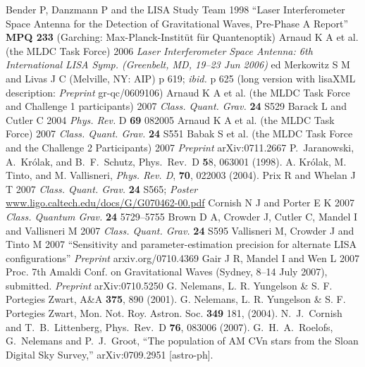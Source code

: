 \documentclass{iopart}
\begin{document}
\begin{thebibliography}{99}
%
 Bender P, Danzmann P and the LISA Study Team 1998 ``Laser Interferometer Space Antenna for the Detection of Gravitational Waves, Pre-Phase A Report'' \textbf{MPQ 233} (Garching: Max-Planck-Instit\"ut f\"ur Quantenoptik) 
%
 Arnaud K A et al. (the MLDC Task Force) 2006 \textit{Laser Interferometer Space Antenna: 6th International LISA Symp. (Greenbelt, MD, 19--23 Jun 2006)} ed Merkowitz S M and Livas J C (Melville, NY: AIP) p 619; \textit{ibid.} p 625 (long version with lisaXML description: \textit{Preprint} gr-qc/0609106)
%
 Arnaud K A et al. (the MLDC Task Force and Challenge 1 participants) 2007 \textit{Class. Quant. Grav.} \textbf{24} S529
%
 Barack L and Cutler C 2004 \textit{Phys. Rev.} D \textbf{69} 082005
%
 Arnaud K A et al. (the MLDC Task Force) 2007 \textit{Class. Quant. Grav.} \textbf{24} S551
%
 Babak S  et al. (the MLDC Task Force and the Challenge 2 Participants) 2007 \textit{Preprint}  arXiv:0711.2667
%
P.\ Jaranowski, A.\ Kr\'olak, and B.\ F.\ Schutz, Phys.\ Rev.\ D
{\textbf 58}, 063001 (1998).
%
 A. Kr\'olak, M. Tinto, and M. Vallisneri, {\it Phys. Rev. D}, {\bf 70},
022003 (2004).
%
 Prix R and Whelan J T 2007 \textit{Class. Quant. Grav.} \textbf{24} S565; \textit{Poster} \url{www.ligo.caltech.edu/docs/G/G070462-00.pdf}
%
 Cornish N J and Porter E K 2007 \textit{Class. Quantum Grav.} \textbf{24} 5729--5755
%
 Brown D A, Crowder J, Cutler C, Mandel I and Vallisneri M 2007 \textit{Class. Quant. Grav.} \textbf{24} S595
%
 Vallisneri M, Crowder J and Tinto M 2007 ``Sensitivity and parameter-estimation precision for alternate LISA configurations'' \textit{Preprint} arxiv.org/0710.4369 
%
 Gair J R, Mandel I and Wen L 2007 Proc. 7th Amaldi Conf. on Gravitational Waves (Sydney, 8--14 July 2007), submitted. \textit{Preprint} arXiv:0710.5250
%
 G. Nelemans, L. R. Yungelson \& S. F. Portegies Zwart, A\&A {\bf 375}, 890 (2001).
%
 G. Nelemans, L. R. Yungelson \& S. F. Portegies Zwart, Mon. Not. Roy. Astron. Soc.
{\bf 349} 181, (2004).
%
 N.~J.~Cornish and T.~B.~Littenberg, Phys.\ Rev.\ D {\bf 76}, 083006 (2007).
%
 G.~H.~A.~Roelofs, G.~Nelemans and P.~J.~Groot,
``The population of AM CVn stars from the Sloan Digital Sky Survey,''
arXiv:0709.2951 [astro-ph].

\end{thebibliography}
\end{document}
